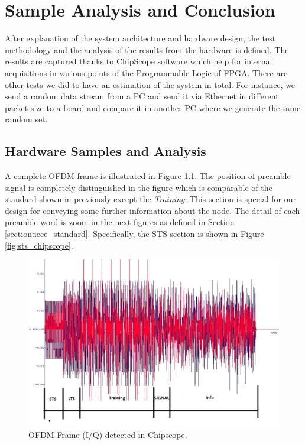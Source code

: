 \chapter{Sample Analysis and Conclusion}
\label{sec:chapter_2}

After explanation of the system architecture and hardware design, the test methodology and the analysis of the results from the hardware is defined. The results are captured thanks to ChipScope software which help for internal acquisitions in various points of the Programmable Logic of FPGA. There are other tests we did to have an estimation of the system in total. For instance, we send a random data stream from a PC and send it via Ethernet in different packet size to a board and compare it in another PC where we generate the same random set.\\

\section{Hardware Samples and Analysis}
\label{hw_samples}

A complete OFDM frame is illustrated in Figure \ref{fig:ofdmframe_chipscope}. The position of preamble signal is completely distinguished in the figure which is comparable of the standard shown in previously except the \textit{Training}. This section is special for our design for conveying some further information about the node. The detail of each preamble word is zoom in the next figures as defined in Section \ref{section:ieee_standard}. Specifically, the STS section is shown in Figure \ref{fig:sts_chipscope}.\\
\begin{figure}
\includegraphics[width=\textwidth]{content/fig/ofdmframe_chipscope.JPG}
\caption{OFDM Frame (I/Q) detected in Chipscope.}
\label{fig:ofdmframe_chipscope}
\end{figure}

